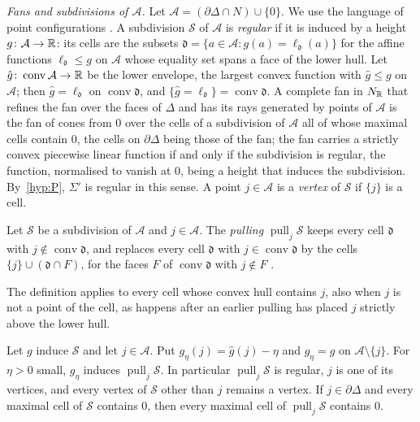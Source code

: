 \emph{Fans and subdivisions of $\mathcal A$.} Let $\mathcal A=(\partial\Delta\cap N)\cup\{0\}$. We use the language of point configurations
\cite{DLRS}. A subdivision $\mathcal S$ of $\mathcal A$ is \emph{regular} if it is induced by a height $g\colon\mathcal A\to\mathbb R$: its cells are
the subsets $\mathfrak d=\{a\in\mathcal A:g(a)=\ell_{\mathfrak d}(a)\}$ for the affine functions $\ell_{\mathfrak d}\le g$ on $\mathcal A$ whose
equality set spans a face of the lower hull. Let $\hat g\colon\operatorname{conv}\mathcal A\to\mathbb R$ be the lower envelope, the largest convex
function with $\hat g\le g$ on $\mathcal A$; then $\hat g=\ell_{\mathfrak d}$ on $\operatorname{conv}\mathfrak d$, and
$\{\hat g=\ell_{\mathfrak d}\}=\operatorname{conv}\mathfrak d$. A complete fan in $N_\mathbb R$ that refines the fan over the faces of $\Delta$ and has
its rays generated by points of $\mathcal A$ is the fan of cones from $0$ over the cells of a subdivision of $\mathcal A$ all of whose maximal
cells contain $0$, the cells on $\partial\Delta$ being those of the fan; the fan carries a strictly convex piecewise linear function if and
only if the subdivision is regular, the function, normalised to vanish at $0$, being a height that induces the subdivision. By~\ref{hyp:P},
$\Sigma'$ is regular in this sense. A point $j\in\mathcal A$ is a \emph{vertex} of $\mathcal S$ if $\{j\}$ is a cell.

\begin{definition}[pulling]\label{def:pulling}
Let $\mathcal S$ be a subdivision of $\mathcal A$ and $j\in\mathcal A$. The \emph{pulling} $\operatorname{pull}_j\mathcal S$ keeps every cell
$\mathfrak d$ with $j\notin\operatorname{conv}\mathfrak d$, and replaces every cell $\mathfrak d$ with $j\in\operatorname{conv}\mathfrak d$ by the
cells $\{j\}\cup(\mathfrak d\cap F)$, for the faces $F$ of $\operatorname{conv}\mathfrak d$ with $j\notin F$ \cite[\S4.3]{DLRS}.
\end{definition}

The definition applies to every cell whose convex hull contains $j$, also when $j$ is not a point of the cell, as happens after an
earlier pulling has placed $j$ strictly above the lower hull.

\begin{lemma}\label{lem:pullreg}
Let $g$ induce $\mathcal S$ and let $j\in\mathcal A$. Put $g_\eta(j)=\hat g(j)-\eta$ and $g_\eta=g$ on $\mathcal A\setminus\{j\}$. For $\eta>0$ small,
$g_\eta$ induces $\operatorname{pull}_j\mathcal S$. In particular $\operatorname{pull}_j\mathcal S$ is regular, $j$ is one of its vertices, and every
vertex of $\mathcal S$ other than $j$ remains a vertex. If $j\in\partial\Delta$ and every maximal cell of $\mathcal S$ contains $0$, then every
maximal cell of $\operatorname{pull}_j\mathcal S$ contains $0$.
\end{lemma}

